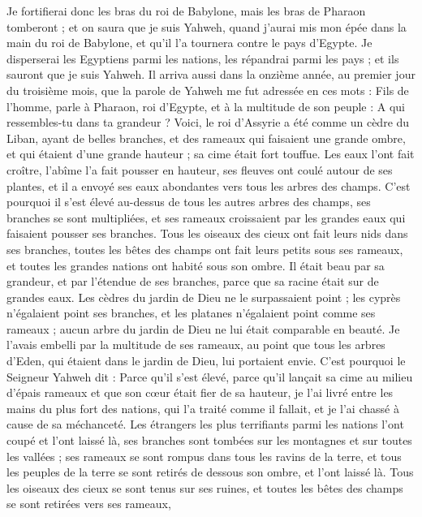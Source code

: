 \begin{multicols}{2}
Je fortifierai donc les bras du roi de Babylone, mais les bras de Pharaon tomberont ; et on saura que je suis Yahweh, quand j'aurai mis mon épée dans la main du roi de Babylone, et qu'il l’a tournera contre le pays d'Egypte.
Je disperserai les Egyptiens parmi les nations, les répandrai parmi les pays ; et ils sauront que je suis Yahweh.
\VerseOne{}Il arriva aussi dans la onzième année, au premier jour du troisième mois, que la parole de Yahweh me fut adressée en ces mots :
Fils de l’homme, parle à Pharaon, roi d'Egypte, et à la multitude de son peuple : A qui ressembles-tu dans ta grandeur ?
Voici, le roi d'Assyrie a été comme un cèdre du Liban, ayant de belles branches, et des rameaux qui faisaient une grande ombre, et qui étaient d'une grande hauteur ; sa cime était fort touffue.
Les eaux l'ont fait croître, l'abîme l'a fait pousser en hauteur, ses fleuves ont coulé autour de ses plantes, et il a envoyé ses eaux abondantes vers tous les arbres des champs.
C'est pourquoi il s’est élevé au-dessus de tous les autres arbres des champs, ses branches se sont multipliées, et ses rameaux croissaient par les grandes eaux qui faisaient pousser ses branches.
Tous les oiseaux des cieux ont fait leurs nids dans ses branches, toutes les bêtes des champs ont fait leurs petits sous ses rameaux, et toutes les grandes nations ont habité sous son ombre.
Il était beau par sa grandeur, et par l'étendue de ses branches, parce que sa racine était sur de grandes eaux.
Les cèdres du jardin de Dieu ne le surpassaient point ; les cyprès n’égalaient point ses branches, et les platanes n'égalaient point comme ses rameaux ; aucun arbre du jardin de Dieu ne lui était comparable en beauté.
Je l'avais embelli par la multitude de ses rameaux, au point que tous les arbres d'Eden, qui étaient dans le jardin de Dieu, lui portaient envie.
C'est pourquoi le Seigneur Yahweh dit : Parce qu’il s’est élevé, parce qu’il lançait sa cime au milieu d’épais rameaux et que son cœur était fier de sa hauteur,
je l'ai livré entre les mains du plus fort des nations, qui l'a traité comme il fallait, et je l'ai chassé à cause de sa méchanceté.
Les étrangers les plus terrifiants parmi les nations l'ont coupé et l'ont laissé là, ses branches sont tombées sur les montagnes et sur toutes les vallées ; ses rameaux se sont rompus dans tous les ravins de la terre, et tous les peuples de la terre se sont retirés de dessous son ombre, et l'ont laissé là.
Tous les oiseaux des cieux se sont tenus sur ses ruines, et toutes les bêtes des champs se sont retirées vers ses rameaux,

\end{multicols}
